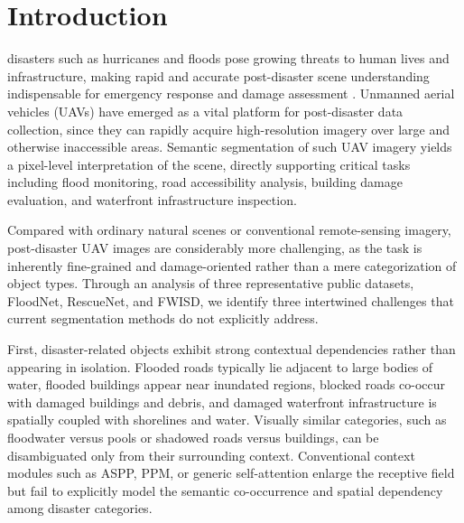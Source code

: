 \documentclass[lettersize,journal]{IEEEtran}
\begin{document}
\section{Introduction}
 disasters such as hurricanes and floods pose growing threats to human lives and infrastructure, making rapid and accurate post-disaster scene understanding indispensable for emergency response and damage assessment \cite{liuStairFusionNetwork2024, liuClusterformerPineTree2024, sarkarSAMVQASupervisedAttentionBased2023}.
Unmanned aerial vehicles (UAVs) have emerged as a vital platform for post-disaster data collection, since they can rapidly acquire high-resolution imagery over large and otherwise inaccessible areas\cite{luLightweightCNNTransformer2024, liuLightWeightSemanticSegmentation2021,salehLiSTNetEnhancedFlood2024}.
Semantic segmentation of such UAV imagery yields a pixel-level interpretation of the scene, directly supporting critical tasks including flood monitoring, road accessibility analysis, building damage evaluation, and waterfront infrastructure inspection\cite{mouRelationMattersRelational2020, niuHybridMultipleAttention2022,piDetectionSemanticSegmentation2021}.

Compared with ordinary natural scenes or conventional remote-sensing imagery, post-disaster UAV images are considerably more challenging, as the task is inherently fine-grained and damage-oriented rather than a mere categorization of object types. Through an analysis of three representative public datasets, FloodNet\cite{rahnemoonfarFloodnetHighResolution2021a}, RescueNet\cite{rahnemoonfarRescueNetHighResolution2023a}, and FWISD\cite{xueFWISDFloodWaterfront2026a}, we identify three intertwined challenges that current segmentation methods do not explicitly address.

First, disaster-related objects exhibit strong contextual dependencies rather than appearing in isolation. Flooded roads typically lie adjacent to large bodies of water, flooded buildings appear near inundated regions, blocked roads co-occur with damaged buildings and debris, and damaged waterfront infrastructure is spatially coupled with shorelines and water. Visually similar categories, such as floodwater versus pools or shadowed roads versus buildings, can be disambiguated only from their surrounding context. Conventional context modules such as ASPP, PPM, or generic self-attention enlarge the receptive field but fail to explicitly model the semantic co-occurrence and spatial dependency among disaster categories\cite{chenRethinkingAtrousConvolution2017, liuStairFusionNetwork2024, zhaoPyramidSceneParsing2017}.
\end{document}
